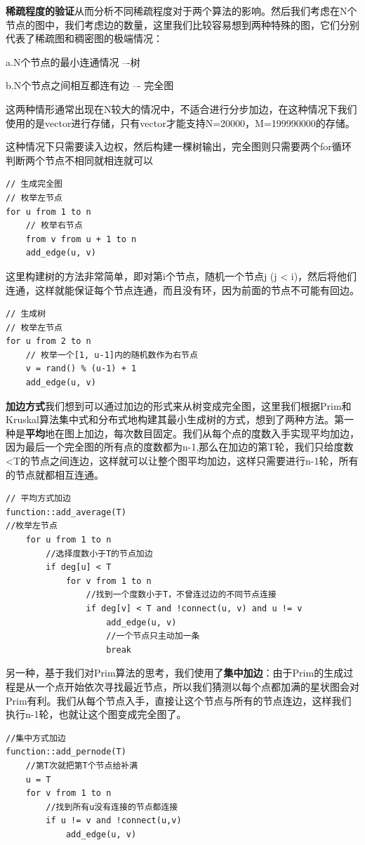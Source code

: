 \documentclass[UTF8]{ctexart}
\begin{document}
\noindent\textbf{稀疏程度的验证}\quad 从而分析不同稀疏程度对于两个算法的影响。然后我们考虑在N个节点的图中，我们考虑边的数量，这里我们比较容易想到两种特殊的图，它们分别代表了稀疏图和稠密图的极端情况：

a.N个节点的最小连通情况 –-树

b.N个节点之间相互都连有边 –- 完全图

这两种情形通常出现在N较大的情况中，不适合进行分步加边，在这种情况下我们使用的是vector进行存储，只有vector才能支持N=20000，M=199990000的存储。

这种情况下只需要读入边权，然后构建一棵树输出，完全图则只需要两个for循环判断两个节点不相同就相连就可以

\begin{lstlisting}
// 生成完全图
// 枚举左节点
for u from 1 to n
    // 枚举右节点
    from v from u + 1 to n
    add_edge(u, v)
\end{lstlisting}

这里构建树的方法非常简单，即对第i个节点，随机一个节点j (j < i)，然后将他们连通，这样就能保证每个节点连通，而且没有环，因为前面的节点不可能有回边。
\begin{lstlisting}
// 生成树
// 枚举左节点
for u from 2 to n
    // 枚举一个[1, u-1]内的随机数作为右节点
    v = rand() % (u-1) + 1
    add_edge(u, v)
\end{lstlisting}


\noindent\textbf{加边方式}\quad 我们想到可以通过加边的形式来从树变成完全图，这里我们根据Prim和Kruskal算法集中式和分布式地构建其最小生成树的方式，想到了两种方法。第一种是\textbf{平均}地在图上加边，每次数目固定。我们从每个点的度数入手实现平均加边，因为最后一个完全图的所有点的度数都为n-1,那么在加边的第T轮，我们只给度数<T的节点之间连边，这样就可以让整个图平均加边，这样只需要进行n-1轮，所有的节点就都相互连通。

\begin{lstlisting}
// 平均方式加边
function::add_average(T)
//枚举左节点
    for u from 1 to n
        //选择度数小于T的节点加边
        if deg[u] < T
            for v from 1 to n
                //找到一个度数小于T，不曾连过边的不同节点连接
                if deg[v] < T and !connect(u, v) and u != v
                    add_edge(u, v)
                    //一个节点只主动加一条
                    break
\end{lstlisting}

另一种，基于我们对Prim算法的思考，我们使用了\textbf{集中加边}：由于Prim的生成过程是从一个点开始依次寻找最近节点，所以我们猜测以每个点都加满的星状图会对Prim有利。我们从每个节点入手，直接让这个节点与所有的节点连边，这样我们执行n-1轮，也就让这个图变成完全图了。
\begin{lstlisting}
//集中方式加边
function::add_pernode(T)
    //第T次就把第T个节点给补满
    u = T
    for v from 1 to n
        //找到所有u没有连接的节点都连接
        if u != v and !connect(u,v)
            add_edge(u, v)
\end{lstlisting}
\end{document}
